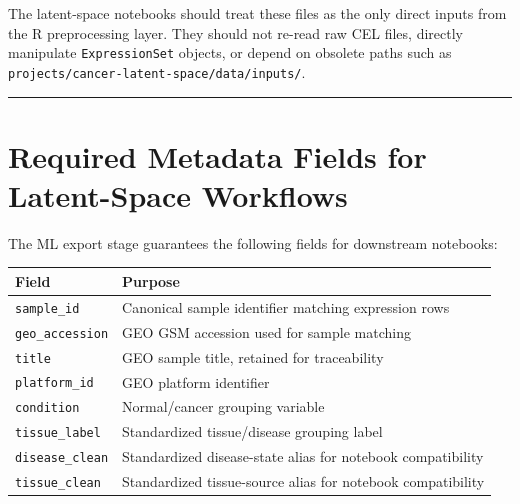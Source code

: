 \documentclass[
  letterpaper,
  DIV=11,
  numbers=noendperiod,
  openany,
  oneside]{scrreprt}
\begin{document}
The latent-space notebooks should treat these files as the only direct
inputs from the R preprocessing layer. They should not re-read raw CEL
files, directly manipulate \texttt{ExpressionSet} objects, or depend on
obsolete paths such as
\texttt{projects/cancer-latent-space/data/inputs/}.

\begin{center}\rule{0.5\linewidth}{0.5pt}\end{center}

\section*{Required Metadata Fields for Latent-Space
Workflows}\label{required-metadata-fields-for-latent-space-workflows}


The ML export stage guarantees the following fields for downstream
notebooks:

\begin{longtable}[]{@{}
  >{\raggedright\arraybackslash}p{}
  >{\raggedright\arraybackslash}p{}@{}}
\toprule\noalign{}
\begin{minipage}[b]{\linewidth}\raggedright
Field
\end{minipage} & \begin{minipage}[b]{\linewidth}\raggedright
Purpose
\end{minipage} \\
\midrule\noalign{}
\endhead
\bottomrule\noalign{}
\endlastfoot
\texttt{sample\_id} & Canonical sample identifier matching expression
rows \\
\texttt{geo\_accession} & GEO GSM accession used for sample matching \\
\texttt{title} & GEO sample title, retained for traceability \\
\texttt{platform\_id} & GEO platform identifier \\
\texttt{condition} & Normal/cancer grouping variable \\
\texttt{tissue\_label} & Standardized tissue/disease grouping label \\
\texttt{disease\_clean} & Standardized disease-state alias for notebook
compatibility \\
\texttt{tissue\_clean} & Standardized tissue-source alias for notebook
compatibility \\
\end{longtable}
\end{document}
